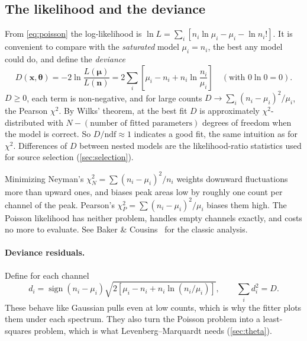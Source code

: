 \documentclass[11pt]{article}
\newcommand{\vth}{\bm{\theta}}
\newcommand{\vx}{\bm{x}}
\newcommand{\vmu}{\bm{\mu}}
\newcommand{\vn}{\bm{n}}
\begin{document}
\subsection{The likelihood and the deviance}
From \cref{eq:poisson} the log-likelihood is $\ln L = \sum_i [n_i\ln\mu_i - \mu_i - \ln n_i!]$. It is convenient to compare with the \emph{saturated} model $\mu_i = n_i$, the best any model could do, and define the \emph{deviance}~\cite{BakerCousins}
\begin{equation}
D(\vx,\vth) = -2\ln\frac{L(\vmu)}{L(\vn)} = 2\sum_i\left[\mu_i - n_i + n_i\ln\frac{n_i}{\mu_i}\right]\quad(\text{with } 0\ln 0 = 0). \label{eq:deviance}
\end{equation}
$D\ge0$, each term is non-negative, and for large counts $D \to \sum_i (n_i-\mu_i)^2/\mu_i$, the Pearson $\chi^2$. By Wilks' theorem, at the best fit $D$ is approximately $\chi^2$-distributed with $N - (\text{number of fitted parameters})$ degrees of freedom when the model is correct. So $D/\mathrm{ndf}\approx1$ indicates a good fit, the same intuition as for $\chi^2$. Differences of $D$ between nested models are the likelihood-ratio statistics used for source selection (\cref{sec:selection}).

\begin{pitfall}
Minimizing Neyman's $\chi^2_N = \sum(n_i-\mu_i)^2/n_i$ weights downward fluctuations more than upward ones, and biases peak areas low by roughly one count per channel of the peak. Pearson's $\chi^2_P = \sum(n_i-\mu_i)^2/\mu_i$ biases them high. The Poisson likelihood has neither problem, handles empty channels exactly, and costs no more to evaluate. See Baker \& Cousins~\cite{BakerCousins} for the classic analysis.
\end{pitfall}

\paragraph{Deviance residuals.} Define for each channel
\begin{equation}
d_i = \operatorname{sign}(n_i-\mu_i)\sqrt{2\left[\mu_i-n_i+n_i\ln(n_i/\mu_i)\right]},\qquad \textstyle\sum_i d_i^2 = D. \label{eq:devres}
\end{equation}
These behave like Gaussian pulls even at low counts, which is why the fitter plots them under each spectrum. They also turn the Poisson problem into a least-squares problem, which is what Levenberg--Marquardt needs (\cref{sec:theta}).
\end{document}
